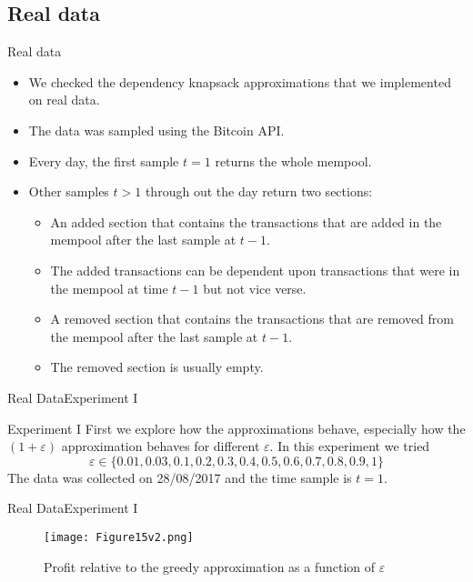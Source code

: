 \documentclass{beamer}
\begin{document}
\subsection* {Real data}
\begin{frame}{Real data}{} 
    \begin{itemize}
        \item {We checked the dependency knapsack approximations that we 
        implemented on real data.}
        \item {The data was sampled using the Bitcoin API.}
        \item {Every day, the first sample $t=1$ returns the whole mempool.}
        \item {Other samples $t>1$ through out the day return two sections:}
        \begin{itemize}
            \item {An added section that contains the transactions that are 
            added in the mempool after the last sample at $t-1$.}
            \item {The added transactions can be dependent upon transactions 
            that were in the mempool at time $t-1$ but not vice verse.}
            \item {A removed section that contains the transactions that are 
            removed from the mempool after the last sample at $t-1$.}
            \item {The removed section is usually empty.}
        \end{itemize}
    \end{itemize}
\end{frame}
\begin{frame}{Real Data}{Experiment I}
    \begin{block}{Experiment I}
    First we explore how the approximations behave, especially how the 
    $(1+\varepsilon)$ approximation behaves for different $\varepsilon$. 
    In this experiment we tried $$\varepsilon \in 
    \{0.01,0.03,0.1,0.2,0.3,0.4,0.5,0.6,0.7,0.8,0.9,1\}$$   
    The data was collected on 28/08/2017 and the time sample is $t=1$.
    \end{block}
\end{frame}

\begin{frame}{Real Data}{Experiment I}
    \begin{figure}
        \centering
        \texttt{[image: Figure15v2.png]}
        \caption{Profit relative to the greedy approximation as a function 
        of $\varepsilon$}
    \end{figure}
\end{frame}
\end{document}
